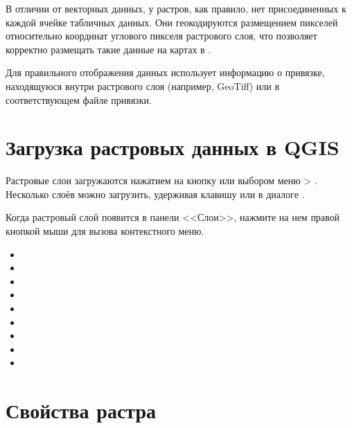 В отличии от векторных данных, у растров, как правило, нет присоединенных к каждой
ячейке табличных данных. Они геокодируются размещением пикселей относительно
координат углового пикселя растрового слоя, что позволяет корректно размещать
такие данные на картах в \qg.

Для правильного отображения данных \qg использует информацию о привязке,
находящуюся внутри растрового слоя (например, GeoTiff) или в соответствующем файле
привязки.

\section{Загрузка растровых данных в QGIS}\label{label_loadraster}

Растровые слои загружаются нажатием на кнопку
 или выбором меню
 >
.
Несколько слоёв можно загрузить, удерживая клавишу 
или  в диалоге .

Когда растровый слой появится в панели <<Слои>>, нажмите на нем правой
кнопкой мыши для вызова контекстного меню.


\begin{itemize}[label=--]
\item {}
\item {}
\item {}
\item {}
\item {}
\item {}
\item {}
\item {}
\item {}
\end{itemize}

\section{Свойства растра}\label{label_rasterprop}

